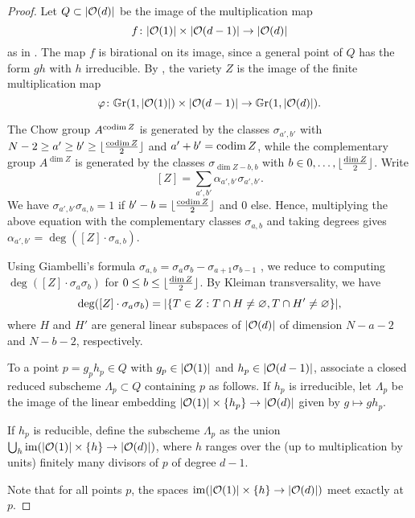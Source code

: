 \begin{proof}
	Let $Q \subset \lvert\mathcal{O}(d)\rvert$ be the image of the multiplication map $$f\colon \lvert\mathcal{O}(1)\rvert \times \lvert\mathcal{O}(d-1)\rvert \to \lvert\mathcal{O}(d)\rvert$$ as in . The map $f$ is birational on its image, since a general point of $Q$ has the form $gh$ with $h$ irreducible. By
	, the variety $Z$ is the image of the finite multiplication map
	$$\varphi \colon \mathbb G \mathrm r(1,\lvert\mathcal{O}(1)\rvert) \times \lvert\mathcal{O}(d-1)\rvert \to \mathbb G \mathrm r(1,\lvert\mathcal{O}(d)\rvert).$$

	The Chow group $A^{\operatorname{codim} Z}$ is generated by the classes $\sigma_{a',b'}$ with $N-2\geq a'\geq b' \geq \lfloor\frac{\operatorname{codim} Z}{2}\rfloor$ and $a'+b'=\operatorname{codim} Z$, while the complementary group $A^{\dim Z}$ is generated by the classes
	$\sigma_{\dim Z-b,b}$ with $b\in {0,\dotsc,\lfloor\frac{\dim Z}{2}\rfloor}$. Write
	\[
		[Z] = \sum_{a',b'} \alpha_{a',b'} \sigma_{a',b'}. 
	\]
	We have $\sigma_{a',b'} \sigma_{a,b} = 1$ if $b'-b = \lfloor\frac{\operatorname{codim} Z}{2}\rfloor$ and $0$ else. Hence, multiplying the above equation with the complementary classes $\sigma_{a,b}$ and taking degrees gives
	$
	\alpha_{a',b'} = \deg([Z]\cdot \sigma_{a,b}).
	$

	Using Giambelli's formula 
	$\sigma_{a,b}=\sigma_{a}\sigma_{b} - \sigma_{a+1}\sigma_{b-1}$ \cite[Prop.\ 4.16]{eisenbud-harris-intersection-theory}, we reduce to computing $\deg([Z] \cdot \sigma_{a}\sigma_{b})$ for $0\leq b\leq \lfloor\frac{\dim Z}{2}\rfloor$.
	By Kleiman transversality, we have 
	\[
	\deg([Z] \cdot \sigma_{a}\sigma_{b}) = \lvert\{T\in Z : T \cap H \neq \varnothing, T \cap H' \neq \varnothing\}\rvert,
	\]
	where $H$ and $H'$ are general linear subspaces of $\lvert\mathcal{O}(d)\rvert$ of dimension $N-a-2$ and $N-b-2$, respectively.

	To a point $p = g_p h_p \in Q$ with $g_p \in \lvert\mathcal{O}(1)\rvert$ and $h_p \in \lvert\mathcal{O}(d-1)\rvert$, associate a closed reduced subscheme $\Lambda_p\subset Q$ containing $p$ as follows. If $h_p$ is irreducible, let $\Lambda_p$ be the image of the linear embedding $\lvert\mathcal{O}(1)\rvert\times \{h_p\} \to \lvert\mathcal{O}(d)\rvert$ given by $g \mapsto g h_p$.

	If $h_p$ is reducible, define the subscheme $\Lambda_p$ as the union $\bigcup_h \operatorname{im}(\lvert\mathcal{O}(1)\rvert \times \{h\}\to \lvert\mathcal{O}(d)\rvert)$, where $h$ ranges over the (up to multiplication by units) finitely many divisors of $p$ of degree $d-1$.

	Note that for all points $p$, the spaces $\operatorname{im}(\lvert\mathcal{O}(1)\rvert \times \{h\}\to \lvert\mathcal{O}(d)\rvert)$ meet exactly at $p$.


\end{proof}
